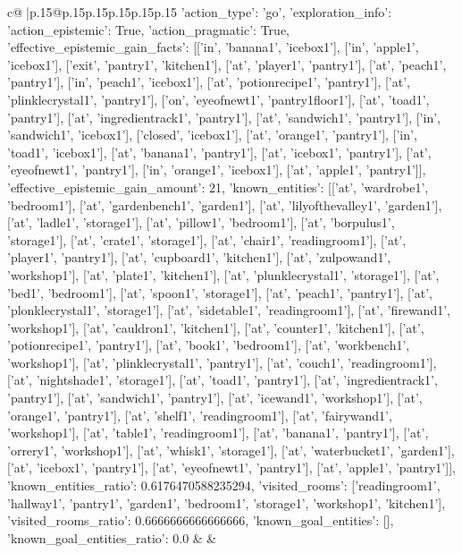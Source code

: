 \documentclass{article}
\begin{document}
{\begin{supertabular}{c@{$\;$}|p{.15\linewidth}@{}p{.15\linewidth}p{.15\linewidth}p{.15\linewidth}p{.15\linewidth}p{.15\linewidth}}
{{{	 {'action_type': 'go', 'exploration_info': {'action_epistemic': True, 'action_pragmatic': True, 'effective_epistemic_gain_facts': [['in', 'banana1', 'icebox1'], ['in', 'apple1', 'icebox1'], ['exit', 'pantry1', 'kitchen1'], ['at', 'player1', 'pantry1'], ['at', 'peach1', 'pantry1'], ['in', 'peach1', 'icebox1'], ['at', 'potionrecipe1', 'pantry1'], ['at', 'plinklecrystal1', 'pantry1'], ['on', 'eyeofnewt1', 'pantry1floor1'], ['at', 'toad1', 'pantry1'], ['at', 'ingredientrack1', 'pantry1'], ['at', 'sandwich1', 'pantry1'], ['in', 'sandwich1', 'icebox1'], ['closed', 'icebox1'], ['at', 'orange1', 'pantry1'], ['in', 'toad1', 'icebox1'], ['at', 'banana1', 'pantry1'], ['at', 'icebox1', 'pantry1'], ['at', 'eyeofnewt1', 'pantry1'], ['in', 'orange1', 'icebox1'], ['at', 'apple1', 'pantry1']], 'effective_epistemic_gain_amount': 21, 'known_entities': [['at', 'wardrobe1', 'bedroom1'], ['at', 'gardenbench1', 'garden1'], ['at', 'lilyofthevalley1', 'garden1'], ['at', 'ladle1', 'storage1'], ['at', 'pillow1', 'bedroom1'], ['at', 'borpulus1', 'storage1'], ['at', 'crate1', 'storage1'], ['at', 'chair1', 'readingroom1'], ['at', 'player1', 'pantry1'], ['at', 'cupboard1', 'kitchen1'], ['at', 'zulpowand1', 'workshop1'], ['at', 'plate1', 'kitchen1'], ['at', 'plunklecrystal1', 'storage1'], ['at', 'bed1', 'bedroom1'], ['at', 'spoon1', 'storage1'], ['at', 'peach1', 'pantry1'], ['at', 'plonklecrystal1', 'storage1'], ['at', 'sidetable1', 'readingroom1'], ['at', 'firewand1', 'workshop1'], ['at', 'cauldron1', 'kitchen1'], ['at', 'counter1', 'kitchen1'], ['at', 'potionrecipe1', 'pantry1'], ['at', 'book1', 'bedroom1'], ['at', 'workbench1', 'workshop1'], ['at', 'plinklecrystal1', 'pantry1'], ['at', 'couch1', 'readingroom1'], ['at', 'nightshade1', 'storage1'], ['at', 'toad1', 'pantry1'], ['at', 'ingredientrack1', 'pantry1'], ['at', 'sandwich1', 'pantry1'], ['at', 'icewand1', 'workshop1'], ['at', 'orange1', 'pantry1'], ['at', 'shelf1', 'readingroom1'], ['at', 'fairywand1', 'workshop1'], ['at', 'table1', 'readingroom1'], ['at', 'banana1', 'pantry1'], ['at', 'orrery1', 'workshop1'], ['at', 'whisk1', 'storage1'], ['at', 'waterbucket1', 'garden1'], ['at', 'icebox1', 'pantry1'], ['at', 'eyeofnewt1', 'pantry1'], ['at', 'apple1', 'pantry1']], 'known_entities_ratio': 0.6176470588235294, 'visited_rooms': ['readingroom1', 'hallway1', 'pantry1', 'garden1', 'bedroom1', 'storage1', 'workshop1', 'kitchen1'], 'visited_rooms_ratio': 0.6666666666666666, 'known_goal_entities': [], 'known_goal_entities_ratio': 0.0}} 
	  } 
	   } 
	   } 
	 & & \\ 
 


\end{supertabular}}
\end{document}
